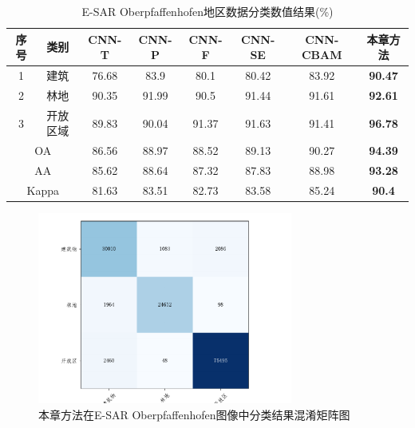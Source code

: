 \begin{table}[ht!]
    \caption{E-SAR Oberpfaffenhofen地区数据分类数值结果(\%)}
    \label{tab:ober_res}
    \begin{tabular}{cccccccc}
        \toprule[1.5bp]
        序号                        & 类别    & CNN-T & CNN-P & CNN-F & CNN-SE & CNN-CBAM       & 本章方法           \\
        \midrule[0.75bp]
        1                         & 建筑    & 76.68 & 83.9  & 80.1  & 80.42  & 83.92          & \textbf{90.47} \\
        2                         & 林地    & 90.35 & 91.99 & 90.5  & 91.44  & 91.61          & \textbf{92.61} \\
        3                         & 开放区域  & 89.83 & 90.04 & 91.37 & 91.63  & 91.41          & \textbf{96.78} \\
        \midrule[0.75bp]
        \multicolumn{2}{c}{OA}    & 86.56 & 88.97 & 88.52 & 89.13 & 90.27  & \textbf{94.39}                  \\
        \multicolumn{2}{c}{AA}    & 85.62 & 88.64 & 87.32 & 87.83 & 88.98  & \textbf{93.28}                  \\
        \multicolumn{2}{c}{Kappa} & 81.63 & 83.51 & 82.73 & 83.58 & 85.24  & \textbf{90.4}                   \\
        \bottomrule[1.5bp]
    \end{tabular}
\end{table}

\begin{figure}[ht!]
    \centering
    \includegraphics[width=8.4cm]{pic/chapter3/ober/conf-matrix.pdf}
    \caption{本章方法在E-SAR Oberpfaffenhofen图像中分类结果混淆矩阵图}
    \label{fig:ober_conf_matrix}
\end{figure}

